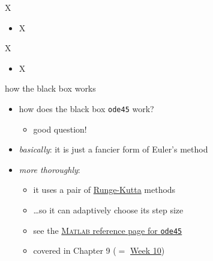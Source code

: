 \documentclass[urlcolor=blue,dvipsnames]{beamer}
\newcommand{\Matlab}{\textsc{Matlab}\xspace}
\begin{document}
\begin{frame}{X}

\begin{itemize}
\item X
\end{itemize}
\end{frame}


\begin{frame}{X}

\begin{itemize}
\item X
\end{itemize}
\end{frame}


\begin{frame}{how the black box works}

\begin{itemize}
\item how does the black box \alert{\texttt{ode45}} work?
    \begin{itemize}
    \item good question!
    \end{itemize}
\item \emph{basically}:  it is just a fancier form of Euler's method
\item \emph{more thoroughly}:
    \begin{itemize}
    \item it uses a pair of \href{https://en.wikipedia.org/wiki/Runge_Kutta_methods}{Runge-Kutta} methods
    \item \dots so it can adaptively choose its step size
    \item see the \href{https://www.mathworks.com/help/matlab/ref/ode45.html}{\Matlab reference page for \texttt{ode45}}
    \item covered in Chapter 9 ($=$ \href{https://bueler.github.io/math302/week10.html}{Week 10})
    \end{itemize}
\end{itemize}
\end{frame}
\end{document}
